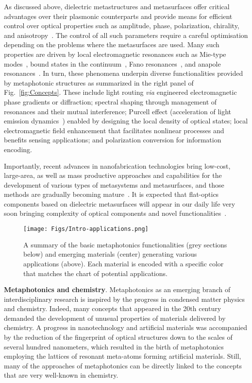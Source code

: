 \documentclass[journal=chreay,manuscript=review]{achemso}
\begin{document}
As discussed above, dielectric metastructures and metasurfaces offer critical advantages over their plasmonic counterparts and provide means for efficient control over optical properties such as amplitude, phase, polarization, chirality, and anisotropy~\cite{cwqiu_2021}. The control of all such parameters require a careful optimisation depending on the problems where the metasurfaces are used. Many such properties are driven by local electromagnetic resonances such as Mie-type modes~\cite{zhao2009mie,kuznetsov2016optically}, bound states in the continuum~\cite{hsu2016bound,BIC_2019}, Fano resonances~\cite{miroshnichenko2010fano,limonov2017fano}, and anapole resonances~\cite{miroshnichenko2015nonradiating,yang2019nonradiating}. In turn, these phenomena underpin diverse functionalities provided by metaphotonic structures as summarized in the right panel of Fig.~\ref{fig:Concepts}. These include light routing \textit{via} engineered electromagnetic phase gradients or diffraction; spectral shaping through management of resonances and their mutual interference; Purcell effect (acceleration of light emission dynamics~\cite{purcell1995spontaneous}) enabled by designing the local density of optical states; local electromagnetic field enhancement that facilitates nonlinear processes and benefits sensing applications; and polarization conversion for information encoding.

Importantly, recent advances in nanofabrication technologies bring low-cost, large-area, as well as mass productive approaches and capabilities for the development of various types of metasystems and metasurfaces, and those methods are gradually becoming mature~\cite{clarke2018large,lee2018metasurface, das2019self, li2020large,yoon2020single,zhizhchenko2020light,jung2021three}. It is expected that flat-optics components based on dielectric metasurfaces will appear in our daily life very soon bringing complexity of optical components and novel functionalities~\cite{capasso}. 

\begin{figure}[t!]
    \centering
    \texttt{[image: Figs/Intro-applications.png]}
    \caption{A summary of the basic metaphotonics functionalities (grey sections below) and emerging materials (center) generating various applications (above). Each material is encoded with a specific color that matches the chart of potential applications.}
    \label{fig:Intro}
\end{figure}

{\bf Metaphotonics and chemistry}. Metaphotonics as an emerging branch of interdisciplinary research is inspired by the progress in condensed matter physics and chemistry. Indeed, many concepts that appeared in the 20th century demanded the development of unusual properties of materials delivered by chemistry. A progress in nanotechnology and artificial materials was accompanied by the reduction of the fingerprint of optical structures down to the scales of several hundred nanometers, which resulted in the birth of metaphotonics employing the lattices of resonant meta-atoms forming artificial materials. Still, many of the approaches of metaphotonics can be directly linked to the concepts that are very well-known in chemistry.
\end{document}
